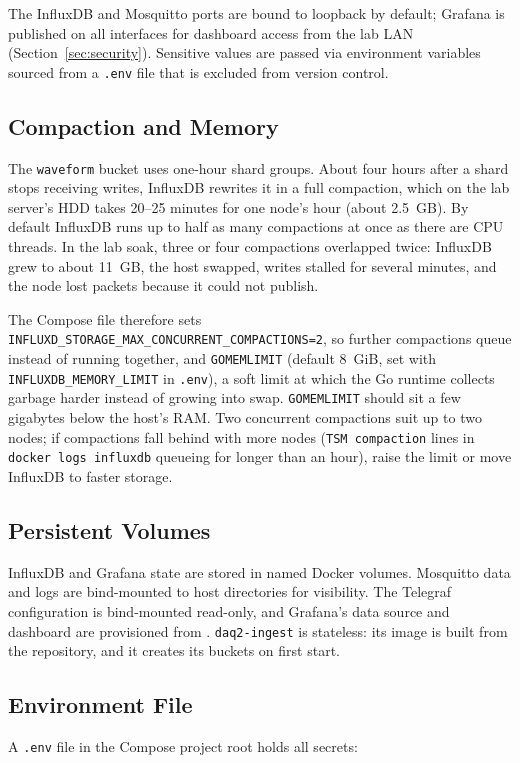 The InfluxDB and Mosquitto ports are bound to loopback by default; Grafana is published on all interfaces for dashboard access from the lab LAN (Section~\ref{sec:security}). Sensitive values are passed via environment variables sourced from a \texttt{.env} file that is excluded from version control.

\subsection{Compaction and Memory}
\label{sec:compaction}
The \texttt{waveform} bucket uses one-hour shard groups. About four hours after a shard stops receiving writes, InfluxDB rewrites it in a full compaction, which on the lab server's HDD takes 20--25 minutes for one node's hour (about 2.5~GB). By default InfluxDB runs up to half as many compactions at once as there are CPU threads. In the lab soak, three or four compactions overlapped twice: InfluxDB grew to about 11~GB, the host swapped, writes stalled for several minutes, and the node lost packets because it could not publish.

The Compose file therefore sets \texttt{INFLUXD\_STORAGE\_MAX\_CONCURRENT\_COMPACTIONS=2}, so further compactions queue instead of running together, and \texttt{GOMEMLIMIT} (default 8~GiB, set with \texttt{INFLUXDB\_MEMORY\_LIMIT} in \texttt{.env}), a soft limit at which the Go runtime collects garbage harder instead of growing into swap. \texttt{GOMEMLIMIT} should sit a few gigabytes below the host's RAM. Two concurrent compactions suit up to two nodes; if compactions fall behind with more nodes (\texttt{TSM compaction} lines in \texttt{docker logs influxdb} queueing for longer than an hour), raise the limit or move InfluxDB to faster storage.

\subsection{Persistent Volumes}
InfluxDB and Grafana state are stored in named Docker volumes. Mosquitto data and logs are bind-mounted to host directories for visibility. The Telegraf configuration is bind-mounted read-only, and Grafana's data source and dashboard are provisioned from . \texttt{daq2-ingest} is stateless: its image is built from the repository, and it creates its buckets on first start.

\subsection{Environment File}
A \texttt{.env} file in the Compose project root holds all secrets:

